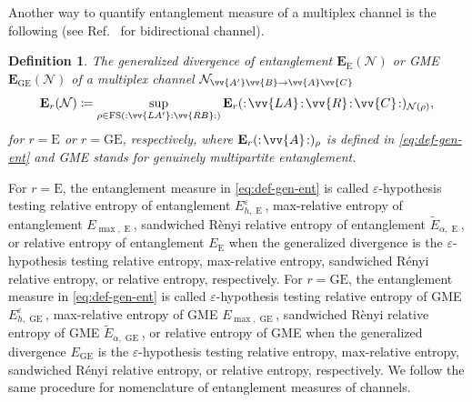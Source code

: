 \documentclass[aps,pra,twocolumn,superscriptaddress,longbibliography]{revtex4-1}
\def\FS{\operatorname{FS}}
\def\GE{\operatorname{GE}}
\def\E{\operatorname{E}}
\newcommand{\mc}[1]{\mathcal{#1}}
\newcommand{\wt}[1]{\widetilde{#1}}
\newcommand{\tf}[1]{\textbf{#1}}
\newtheorem{definition}{Definition}
\begin{document}
Another way to quantify entanglement measure of a multiplex channel is the following (see Ref.~\cite{D18thesis} for bidirectional channel).
\begin{definition}\label{def:gen-div-ent-c}
The generalized divergence of entanglement $\tf{E}_\text{E}(\mc{N})$ or GME $\tf{E}_{\text{GE}}(\mc{N})$ of a multiplex channel $\mc{N}_{\vv{A'}\vv{B}\to\vv{A}\vv{C}}$
\begin{equation}\label{eq:def-gen-ent-c}
\tf{E}_{r}(\mc{N})\coloneqq \sup_{\rho\in\FS(:\vv{LA'}:\vv{RB}:)}\tf{E}_{r}(:\!\vv{LA}\!:\!\vv{R}\!:\!\vv{C}\!:)_{\mc{N}(\rho)},
\end{equation} 
for $r=\text{E}$ or $r=\text{GE}$, respectively, where $\tf{E}_{r}(:\!\vv{A}\!:)_{\rho}$ is defined in \eqref{eq:def-gen-ent} and GME stands for genuinely multipartite entanglement.
\end{definition}

For $r=\text{E}$, the entanglement measure in \eqref{eq:def-gen-ent} is called $\varepsilon$-hypothesis testing relative entropy of entanglement $E^\varepsilon_{h,\E}$, max-relative entropy of entanglement $E_{\max,\E}$, sandwiched R\`{e}nyi relative entropy of entanglement $\wt{E}_{\alpha, \E}$, or relative entropy of entanglement $E_{\E}$ when the generalized divergence is the $\varepsilon$-hypothesis testing relative entropy, max-relative entropy, sandwiched R\'{enyi} relative entropy, or relative entropy, respectively. For $r=\text{GE}$, the entanglement measure in \eqref{eq:def-gen-ent} is called $\varepsilon$-hypothesis testing relative entropy of GME $E^\varepsilon_{h,\GE}$, max-relative entropy of GME $E_{\max,\GE}$, sandwiched R\`{e}nyi relative entropy of GME $\wt{E}_{\alpha, \GE}$, or relative entropy of GME when the generalized divergence $E_{\GE}$ is the $\varepsilon$-hypothesis testing relative entropy, max-relative entropy, sandwiched R\'{enyi} relative entropy, or relative entropy, respectively. We follow the same procedure for nomenclature of entanglement measures of channels. 
\end{document}
